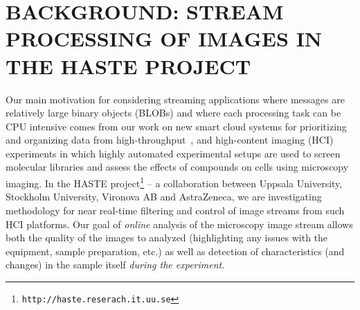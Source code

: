 \documentclass[conference]{IEEEtran}
\begin{document}


\section{BACKGROUND: STREAM PROCESSING OF IMAGES IN THE HASTE PROJECT}\label{background}

Our main motivation for considering streaming applications where messages are relatively large binary objects (BLOBs) and where each processing task can be CPU intensive comes from our work on new smart cloud systems for prioritizing and organizing data from high-throughput~\cite{wollmanHighThroughputMicroscopy2007}, and high-content imaging (HCI) experiments in which highly automated experimental setups are used to screen molecular libraries and assess the effects of compounds on cells using microscopy imaging. In the HASTE project\footnote{\texttt{http://haste.reserach.it.uu.se}} -- a collaboration between Uppsala University, Stockholm University, Vironova AB and AstraZeneca, we are investigating methodology for near real-time filtering and control of image streams from such HCI platforms. 
Our goal of \emph{online} analysis of the microscopy image stream allows both the quality of the images to analyzed (highlighting any issues with the equipment, sample preparation, etc.) as well as detection of characteristics (and changes) in the sample itself \emph{during the experiment}. 
\end{document}
